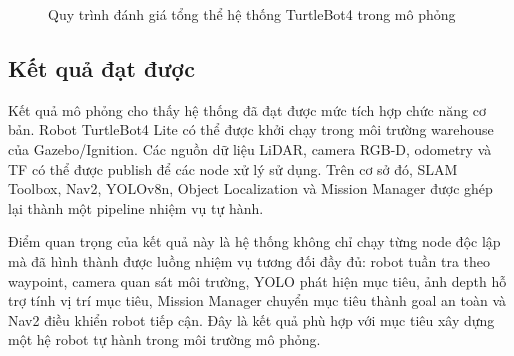\begin{figure}[H]
\centering
{}
\caption{Quy trình đánh giá tổng thể hệ thống TurtleBot4 trong mô phỏng}
\label{fig:overall-evaluation-process}
\end{figure}

\subsection{Kết quả đạt được}
\label{subsec:achieved-results}

Kết quả mô phỏng cho thấy hệ thống đã đạt được mức tích hợp chức năng cơ bản. Robot TurtleBot4 Lite có thể được khởi chạy trong môi trường warehouse của Gazebo/Ignition. Các nguồn dữ liệu LiDAR, camera RGB-D, odometry và TF có thể được publish để các node xử lý sử dụng. Trên cơ sở đó, SLAM Toolbox, Nav2, YOLOv8n, Object Localization và Mission Manager được ghép lại thành một pipeline nhiệm vụ tự hành.

Điểm quan trọng của kết quả này là hệ thống không chỉ chạy từng node độc lập mà đã hình thành được luồng nhiệm vụ tương đối đầy đủ: robot tuần tra theo waypoint, camera quan sát môi trường, YOLO phát hiện mục tiêu, ảnh depth hỗ trợ tính vị trí mục tiêu, Mission Manager chuyển mục tiêu thành goal an toàn và Nav2 điều khiển robot tiếp cận. Đây là kết quả phù hợp với mục tiêu xây dựng một hệ robot tự hành trong môi trường mô phỏng.

